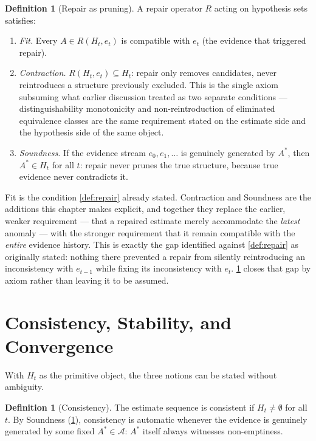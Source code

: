 \documentclass[11pt]{book}
\theoremstyle{plain}
\theoremstyle{definition}
\newtheorem{definition}[theorem]{Definition}
\theoremstyle{remark}
\begin{document}
\begin{definition}[Repair as pruning]
\label{def:repair-pruning}
A repair operator $R$ acting on hypothesis sets satisfies:
\begin{enumerate}
\item \emph{Fit.} Every $A \in R(H_t, e_t)$ is compatible with $e_t$
(the evidence that triggered repair).
\item \emph{Contraction.} $R(H_t, e_t) \subseteq H_t$: repair only
removes candidates, never reintroduces a structure previously
excluded. This is the single axiom subsuming what earlier discussion
treated as two separate conditions --- distinguishability monotonicity
and non-reintroduction of eliminated equivalence classes are the same
requirement stated on the estimate side and the hypothesis side of the
same object.
\item \emph{Soundness.} If the evidence stream $e_0, e_1, \dots$ is
genuinely generated by $A^*$, then $A^* \in H_t$ for all $t$: repair
never prunes the true structure, because true evidence never
contradicts it.
\end{enumerate}
\end{definition}

Fit is the condition \cref{def:repair} already stated. Contraction and
Soundness are the additions this chapter makes explicit, and together
they replace the earlier, weaker requirement --- that a repaired
estimate merely accommodate the \emph{latest} anomaly --- with the
stronger requirement that it remain compatible with the \emph{entire}
evidence history. This is exactly the gap identified against
\cref{def:repair} as originally stated: nothing there prevented a
repair from silently reintroducing an inconsistency with $e_{t-1}$
while fixing its inconsistency with $e_t$. \cref{def:repair-pruning}
closes that gap by axiom rather than leaving it to be assumed.

\section{Consistency, Stability, and Convergence}

With $H_t$ as the primitive object, the three notions can be stated
without ambiguity.

\begin{definition}[Consistency]
\label{def:consistency}
The estimate sequence is consistent if $H_t \neq \emptyset$ for all
$t$. By Soundness (\cref{def:repair-pruning}), consistency is
automatic whenever the evidence is genuinely generated by some fixed
$A^* \in \mathcal{A}$: $A^*$ itself always witnesses non-emptiness.
\end{definition}
\end{document}
